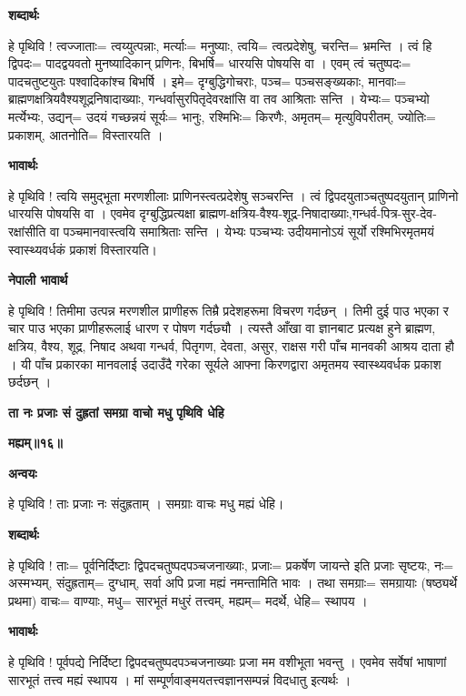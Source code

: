 \documentclass[11pt, a5paper]{article}
\begin{document}
\textbf{शब्दार्थः}

हे पृथिवि ! त्वज्जाताः= त्वय्युत्पन्नाः, मर्त्याः= मनुष्याः, त्वयि=  त्वत्प्रदेशेषु, चरन्ति= भ्रमन्ति । त्वं हि द्विपदः= पादद्वयवतो मुनष्यादिकान् प्रणिनः, बिभर्षि= धारयसि पोषयसि वा । एवम् त्वं चतुष्पदः= पादचतुष्टयुतः पश्वादिकांश्च बिभर्षि । इमे= दृग्बुद्धिगोचराः, पञ्च= पञ्चसङ्‍ख्यकाः, मानवाः= ब्राह्मणक्षत्रियवैश्यशूद्रनिषादाख्याः, गन्धर्वासुरपितृदेवरक्षांसि वा तव आश्रिताः सन्ति । येभ्यः= पञ्चभ्यो मर्त्येभ्यः, उद्यन्= उदयं गच्छन्नयं सूर्यः= भानुः, रश्मिभिः= किरणैः, अमृतम्= मृत्युविपरीतम्, ज्योतिः= प्रकाशम्, आतनोति= विस्तारयति ।

\textbf{भावार्थः}

हे पृथिवि ! त्वयि समुद्भूता मरणशीलाः प्राणिनस्त्वत्प्रदेशेषु सञ्चरन्ति । त्वं द्विपदयुताञ्चतुष्पदयुतान् प्राणिनो धारयसि पोषयसि वा । एवमेव दृग्बुद्धिप्रत्यक्षा ब्राह्मण-क्षत्रिय-वैश्य-शूद्र-निषादाख्याः,गन्धर्व-पित्र-सुर-देव-रक्षांसीति वा पञ्चमानवास्त्वयि समाश्रिताः सन्ति । येभ्यः पञ्चभ्यः उदीयमानोऽयं सूर्यो रश्मिभिरमृतमयं स्वास्थ्यवर्धकं प्रकाशं विस्तारयति।

\textbf{नेपाली भावार्थ}

हे पृथिवि ! तिमीमा उत्पन्न मरणशील प्राणीहरू तिम्रै प्रदेशहरूमा विचरण गर्दछन् । तिमी दुई पाउ भएका र चार पाउ भएका प्राणीहरूलाई धारण र पोषण गर्दछ्यौ । त्यस्तै आँखा वा ज्ञानबाट प्रत्यक्ष हुने ब्राह्मण, क्षत्रिय, वैश्य, शूद्र, निषाद अथवा गन्धर्व, पितृगण, देवता, असुर, राक्षस गरी पाँच मानवकी आश्रय दाता हौ । यी पाँच प्रकारका मानवलाई उदाउँदै गरेका सूर्यले आफ्ना किरणद्वारा अमृतमय स्वास्थ्यवर्धक प्रकाश छर्दछन् ।

\textbf{ता नः प्रजाः सं दुह्रतां समग्रा वाचो मधु पृथिवि धेहि}

\textbf{मह्यम्॥१६॥}

\textbf{अन्वयः}

हे पृथिवि ! ताः प्रजाः नः संदुह्रताम् । समग्राः वाचः मधु मह्यं धेहि।

\textbf{शब्दार्थः}

हे पृथिवि ! ताः= पूर्वनिर्दिष्टाः द्विपदचतुष्पदपञ्चजनाख्याः, प्रजाः= प्रकर्षेण जायन्ते इति प्रजाः सृष्टयः, नः= अस्मभ्यम्, संदुह्रताम्= दुग्धाम्, सर्वा अपि प्रजा मह्यं नमन्तामिति भावः । तथा समग्राः= समग्रायाः (षष्ठ्यर्थे प्रथमा) वाचः= वाण्याः, मधु= सारभूतं मधुरं तत्त्वम्, मह्यम्= मदर्थे, धेहि= स्थापय ।

\textbf{भावार्थः}

हे पृथिवि ! पूर्वपद्ये निर्दिष्टा द्विपदचतुष्पदपञ्चजनाख्याः प्रजा मम वशीभूता भवन्तु । एवमेव सर्वेषां भाषाणां सारभूतं तत्त्व मह्यं स्थापय । मां सम्पूर्णवाङ्मयतत्त्वज्ञानसम्पन्नं विदधातु इत्यर्थः ।
\end{document}
